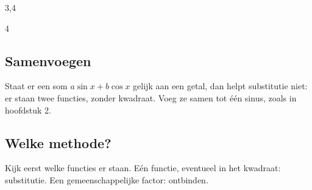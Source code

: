 \begin{alleenvoor}{3,4}
\begin{oefeningen}
\end{oefeningen}

\begin{alleenvoor}{4}
\subsection{Samenvoegen}

Staat er een som $a\sin x + b\cos x$ gelijk aan een getal, dan helpt substitutie niet: er staan twee functies, zonder kwadraat. Voeg ze samen tot één sinus, zoals in hoofdstuk 2.


\begin{oefeningen}
\end{oefeningen}
\end{alleenvoor}

\subsection{Welke methode?}

Kijk eerst welke functies er staan. Eén functie, eventueel in het kwadraat: substitutie. Een gemeenschappelijke factor: ontbinden.

\begin{oefeningen}
\end{oefeningen}
\end{alleenvoor}

